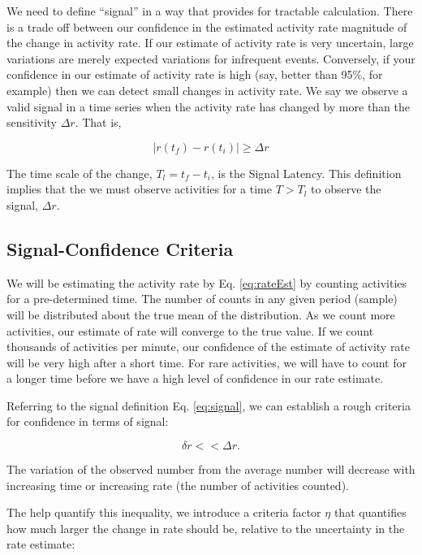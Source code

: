 \documentclass{article}
\begin{document}
We need to define ``signal'' in a way that provides for tractable calculation.  There is a trade off between our confidence in the estimated activity rate magnitude of the change in  activity rate.  If our estimate of activity rate is very uncertain, large variations are merely expected variations for infrequent events.  Conversely, if your confidence in our estimate of activity rate is high (say, better than 95\%, for example) then we can detect small changes in activity rate.  We say we observe a valid signal in a time series when the activity rate has changed by more than the sensitivity $\Delta r$.  That is,

\begin{equation}
    \label{eq:signal}
    | r(t_f) - r(t_i) | \geq \Delta r
\end{equation}

The time scale of the change, $T_l = t_f - t_i$, is the Signal Latency.  This definition implies that the we must observe activities for a time $T > T_l$ to observe the signal, $\Delta r$.

\subsection{Signal-Confidence Criteria} 

We will be estimating the activity rate by Eq. \ref{eq:rateEst} by counting activities for a pre-determined time.  The number of counts in any given period (sample) will be distributed about the true mean of the distribution. As we count more activities, our estimate of rate will converge to the true value.  If we count thousands of activities per minute, our confidence of the estimate of activity rate will be very high after a short time.  For rare activities, we will have to count for a longer time before we have a high level of confidence in our rate estimate.

Referring to the signal definition Eq. \ref{eq:signal}, we can establish a rough criteria for confidence in terms of signal: 

\begin{equation}
    \label{eq:criteria}
    \delta r << \Delta r.
\end{equation}

The variation of the observed number from the average number will decrease with increasing time or increasing rate (the number of activities counted).

The help quantify this inequality, we introduce a criteria factor $\eta$ that quantifies how much larger the change in rate should be, relative to the uncertainty in the rate estimate:
\end{document}
